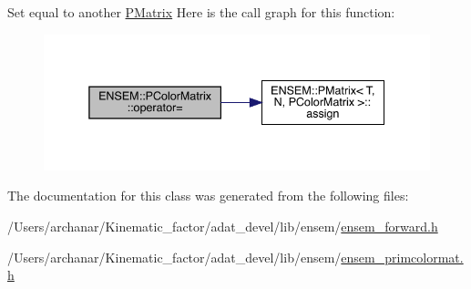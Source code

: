 Set equal to another \mbox{\hyperlink{classENSEM_1_1PMatrix}{P\+Matrix}} Here is the call graph for this function\+:
\nopagebreak
\begin{figure}[H]
\begin{center}
\leavevmode
\includegraphics[width=338pt]{d8/d21/classENSEM_1_1PColorMatrix_a529b6a2c63f2087a6a336af14b6f80eb_cgraph}
\end{center}
\end{figure}


The documentation for this class was generated from the following files\+:\begin{DoxyCompactItemize}
\item 
/\+Users/archanar/\+Kinematic\+\_\+factor/adat\+\_\+devel/lib/ensem/\mbox{\hyperlink{lib_2ensem_2ensem__forward_8h}{ensem\+\_\+forward.\+h}}\item 
/\+Users/archanar/\+Kinematic\+\_\+factor/adat\+\_\+devel/lib/ensem/\mbox{\hyperlink{lib_2ensem_2ensem__primcolormat_8h}{ensem\+\_\+primcolormat.\+h}}\end{DoxyCompactItemize}
